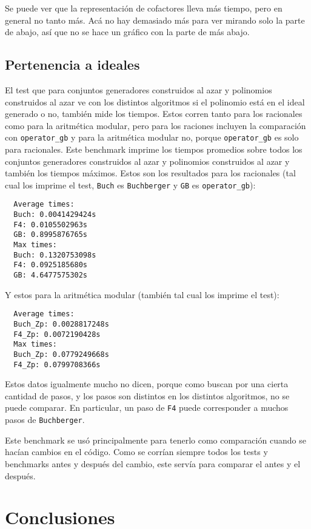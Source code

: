 \documentclass[12pt]{report}
\theoremstyle{customstyle}
\theoremstyle{factstyle}
\begin{document}
Se puede ver que la representación de cofactores lleva más tiempo, pero en general no tanto más. Acá no hay demasiado más para ver mirando solo la parte de abajo, así que no se hace un gráfico con la parte de más abajo.

\section{Pertenencia a ideales}

El test que para conjuntos generadores construidos al azar y polinomios construidos al azar ve con los distintos algoritmos si el polinomio está en el ideal generado o no, también mide los tiempos. Estos corren tanto para los racionales como para la aritmética modular, pero para los raciones incluyen la comparación con \texttt{operator\_gb} y para la aritmética modular no, porque \texttt{operator\_gb} es solo para racionales. Este benchmark imprime los tiempos promedios sobre todos los conjuntos generadores construidos al azar y polinomios construidos al azar y también los tiempos máximos. Estos son los resultados para los racionales (tal cual los imprime el test, \texttt{Buch} es \texttt{Buchberger} y \texttt{GB} es \texttt{operator\_gb}):

\begin{verbatim}
  Average times:
  Buch: 0.0041429424s
  F4: 0.0105502963s
  GB: 0.8995876765s
  Max times:
  Buch: 0.1320753098s
  F4: 0.0925185680s
  GB: 4.6477575302s
\end{verbatim}

Y estos para la aritmética modular (también tal cual los imprime el test):

\begin{verbatim}
  Average times:
  Buch_Zp: 0.0028817248s
  F4_Zp: 0.0072190428s
  Max times:
  Buch_Zp: 0.0779249668s
  F4_Zp: 0.0799708366s
\end{verbatim}

Estos datos igualmente mucho no dicen, porque como buscan por una cierta cantidad de pasos, y los pasos son distintos en los distintos algoritmos, no se puede comparar. En particular, un paso de \texttt{F4} puede corresponder a muchos pasos de \texttt{Buchberger}.

Este benchmark se usó principalmente para tenerlo como comparación cuando se hacían cambios en el código. Como se corrían siempre todos los tests y benchmarks antes y después del cambio, este servía para comparar el antes y el después.

\chapter{Conclusiones}
\end{document}
